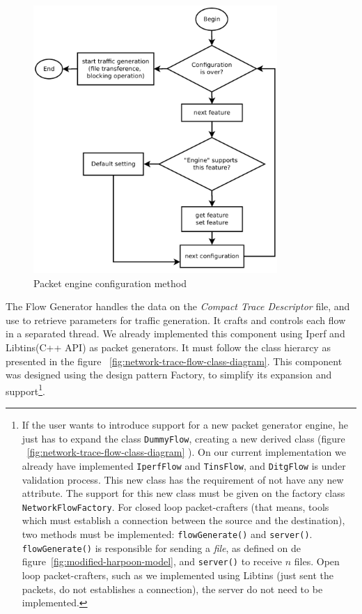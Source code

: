 \begin{figure}[ht!]
	\centering
	\includegraphics[height=4.0in]{figures/ch3/alg-traffic-engine-config}
	\caption{Packet engine configuration method}
	\label{fig:alg-traffic-engine-config}
\end{figure}


The Flow Generator handles the data on the \textit{Compact Trace Descriptor} file, and use to retrieve parameters for traffic generation. It crafts and controls each flow in a separated thread. We already implemented this component using Iperf and Libtins(C++ API) as packet generators. It must follow the class hierarcy as presented in the figure ~\ref{fig:network-trace-flow-class-diagram}.  This component was designed using the design pattern Factory, to simplify its expansion and support\footnote{If the user wants to introduce support for a new packet generator engine, he just has to expand the class \texttt{DummyFlow}, creating a new derived class (figure ~\ref{fig:network-trace-flow-class-diagram} ). On our current implementation we already have implemented \texttt{IperfFlow} and \texttt{TinsFlow}, and \texttt{DitgFlow} is under validation process. This new class has the requirement of not have any new attribute. The support for this new class must be given on the factory class \texttt{NetworkFlowFactory}. For closed loop packet-crafters (that means, tools which must establish a connection between the source and the destination), two methods must be implemented: \texttt{flowGenerate()} and \texttt{server()}. \texttt{flowGenerate()} is responsible for sending a \textit{file}, as defined on de figure~\ref{fig:modified-harpoon-model}, and \texttt{server()} to receive $n$ files. Open loop packet-crafters, such as we implemented using Libtins (just sent the packets, do not establishes a connection), the server do not need to be implemented.}. 



